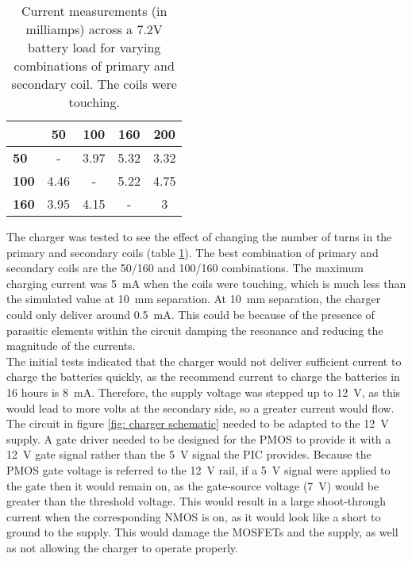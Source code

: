 \begin{table}[htb]
	\begin{center}
	\caption{Current measurements (in milliamps) across a 7.2V battery load for varying combinations of primary and secondary coil. The coils were touching.}
	\label{tab: coil combinations}
	\begin{tabular}{|l|*{4}{c|}}
		\hline
		\backslashbox{\textbf{Primary Turns}}{\textbf{Secondary Turns}} & \textbf{50} & \textbf{100} & \textbf{160} & \textbf{200} \\
		\hline
		\textbf{50} & - & 3.97 & 5.32 & 3.32 \\
		\hline
		\textbf{100} & 4.46 & - & 5.22 & 4.75 \\
		\hline
		\textbf{160} & 3.95 & 4.15 & - & 3\\
		\hline
	\end{tabular}
	\end{center}
\end{table}

The charger was tested to see the effect of changing the number of turns in the primary and secondary coils (table \ref{tab: coil combinations}). The best combination of primary and secondary coils are the 50/160 and 100/160 combinations. The maximum charging current was \SI{5}{\milli\ampere} when the coils were touching, which is much less than the simulated value at \SI{10}{\milli\metre} separation. At \SI{10}{\milli\metre} separation, the charger could only deliver around \SI{0.5}{\milli\ampere}. This could be because of the presence of parasitic elements within the circuit damping the resonance and reducing the magnitude of the currents. \\ 



The initial tests indicated that the charger would not deliver sufficient current to charge the batteries quickly, as the recommend current to charge the batteries in 16 hours is \SI{8}{\milli\ampere}. Therefore, the supply voltage was stepped up to \SI{12}{\volt}, as this would lead to more volts at the secondary side, so a greater current would flow. The circuit in figure \ref{fig: charger schematic} needed to be adapted to the \SI{12}{\volt} supply. A gate driver needed to be designed for the PMOS to provide it with a \SI{12}{\volt} gate signal rather than the \SI{5}{\volt} signal the PIC provides. Because the PMOS gate voltage is referred to the \SI{12}{\volt} rail, if a \SI{5}{\volt} signal were applied to the gate then it would remain on, as the gate-source voltage (\SI{7}{\volt}) would be greater than the threshold voltage. This would result in a large shoot-through current when the corresponding NMOS is on, as it would look like a short to ground to the supply. This would damage the MOSFETs and the supply, as well as not allowing the charger to operate properly. \\

